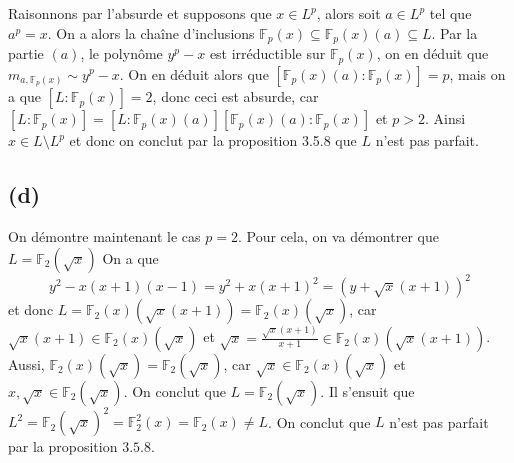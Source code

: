 \documentclass{article}
\newcommand{\F}{\mathbb{F}}
\begin{document}
Raisonnons par l'absurde et supposons que $x \in L^p$, alors soit $a \in L^p$
tel que $a^p = x$. On a alors la chaîne d'inclusions
$\F_p(x) \subseteq \F_p(x)(a) \subseteq L$.
Par la partie $(a)$, le polynôme $y^p - x$ est irréductible sur $\F_p(x)$, on 
en déduit que $m_{a, \F_p(x)} \sim y^p - x$. On en déduit alors que
$[\F_p(x)(a) : \F_p(x)] = p$, mais on a que $[L : \F_p(x)] = 2$, donc ceci est
absurde, car $[L:\F_p(x)] = [L:\F_p(x)(a)][\F_p(x)(a):\F_p(x)]$ et $p > 2$.
Ainsi $x \in L\setminus L^p$ et donc on conclut par la proposition 3.5.8 que
$L$ n'est pas parfait.

\subsection*{(d)}

On démontre maintenant le cas $p = 2$.
Pour cela, on va démontrer que $L = \F_2(\sqrt{x})$
On a que
\begin{equation*}
	y^2 - x(x+1)(x-1) = y^2 + x(x+1)^2 = (y + \sqrt{x}(x+1))^2
\end{equation*}
et donc
$L = \F_2(x)(\sqrt{x}(x+1)) = \F_2(x)(\sqrt{x})$, car
$\sqrt{x}(x+1) \in \F_2(x)(\sqrt{x})$ et
$\sqrt{x} = \frac{\sqrt{x}(x+1)}{x+1} \in \F_2(x)(\sqrt{x}(x+1))$.
Aussi, $\F_2(x)(\sqrt{x}) = \F_2(\sqrt{x})$, car 
$\sqrt{x} \in \F_2(x)(\sqrt{x})$ et $x, \sqrt{x} \in \F_2(\sqrt{x})$.
On conclut que $L = \F_2(\sqrt{x})$.
Il s'ensuit que $L^2 = \F_2(\sqrt{x})^2 = \F_2^2(x) = \F_2(x) \neq L$.
On conclut que $L$ n'est pas parfait par la proposition $3.5.8$.
\end{document}
